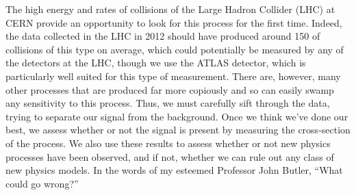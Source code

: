 The high energy and rates of collisions of the Large Hadron Collider (LHC) at CERN
provide an opportunity to look for this process for the first time. 
Indeed, the data collected in the LHC in 2012 should have produced around 150 of collisions
of this type on average, which could potentially be measured by any of the detectors
at the LHC, though we use the ATLAS detector, which is particularly well suited 
for this type of measurement. There are, however, many other processes that are produced
far more copiously and so can easily swamp any sensitivity to this process. 
Thus, we must carefully sift through the data, trying to separate our signal
from the background.  Once we think we've done our best, we assess 
whether or not the signal is present by measuring the cross-section of the process. 
We also use these results to assess whether or not new physics processes have been 
observed, and if not, whether we can rule out any class of new physics models. 
In the words of my esteemed Professor John Butler, ``What could go wrong?''


